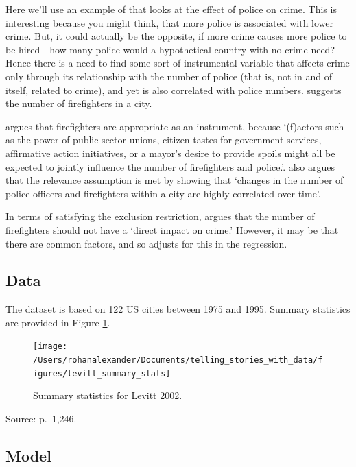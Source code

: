 \documentclass[
]{book}
\begin{document}
Here we'll use an example of \citet{levitt2002using} that looks at the effect of police on crime. This is interesting because you might think, that more police is associated with lower crime. But, it could actually be the opposite, if more crime causes more police to be hired - how many police would a hypothetical country with no crime need? Hence there is a need to find some sort of instrumental variable that affects crime only through its relationship with the number of police (that is, not in and of itself, related to crime), and yet is also correlated with police numbers. \citet{levitt2002using} suggests the number of firefighters in a city.

\citet{levitt2002using} argues that firefighters are appropriate as an instrument, because `(f)actors such as the power of public sector unions, citizen tastes for government services, affirmative action initiatives, or a mayor's desire to provide spoils might all be expected to jointly influence the number of firefighters and police.'. \citet{levitt2002using} also argues that the relevance assumption is met by showing that `changes in the number of police officers and firefighters within a city are highly correlated over time'.

In terms of satisfying the exclusion restriction, \citet{levitt2002using} argues that the number of firefighters should not have a `direct impact on crime.' However, it may be that there are common factors, and so \citet{levitt2002using} adjusts for this in the regression.

\hypertarget{data-1}{%
\subsection{Data}\label{data-1}}

The dataset is based on 122 US cities between 1975 and 1995. Summary statistics are provided in Figure \ref{fig:levittcrime}.

\begin{figure}
\texttt{[image: /Users/rohanalexander/Documents/telling\_stories\_with\_data/figures/levitt\_summary\_stats]} \caption{Summary statistics for Levitt 2002.}\label{fig:levittcrime}
\end{figure}

Source: \citet{levitt2002using} p.~1,246.

\hypertarget{model-1}{%
\subsection{Model}\label{model-1}}
\end{document}
